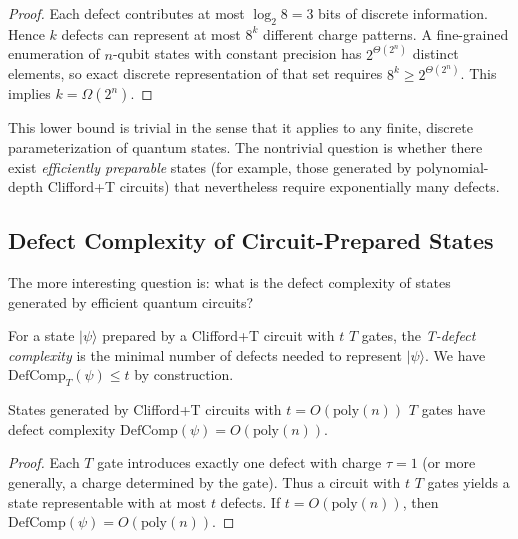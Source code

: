 \begin{proof}
Each defect contributes at most $\log_2 8 = 3$ bits of discrete information. Hence $k$ defects can represent at most $8^k$ different charge patterns. A fine-grained enumeration of $n$-qubit states with constant precision has $2^{\Theta(2^n)}$ distinct elements, so exact discrete representation of that set requires $8^k \ge 2^{\Theta(2^n)}$. This implies $k = \Omega(2^n)$.
\end{proof}

\begin{remark}
This lower bound is trivial in the sense that it applies to any finite, discrete parameterization of quantum states. The nontrivial question is whether there exist \textit{efficiently preparable} states (for example, those generated by polynomial-depth Clifford+T circuits) that nevertheless require exponentially many defects.
\end{remark}

\subsection{Defect Complexity of Circuit-Prepared States}

The more interesting question is: what is the defect complexity of states generated by efficient quantum circuits?

\begin{definition}
For a state $|\psi\rangle$ prepared by a Clifford+T circuit with $t$ $T$ gates, the \textit{T-defect complexity} is the minimal number of defects needed to represent $|\psi\rangle$. We have $\text{DefComp}_T(\psi) \leq t$ by construction.
\end{definition}

\begin{theorem}
\label{thm:t-defect-polynomial}
States generated by Clifford+T circuits with $t = O(\text{poly}(n))$ $T$ gates have defect complexity $\text{DefComp}(\psi) = O(\text{poly}(n))$.
\end{theorem}

\begin{proof}
Each $T$ gate introduces exactly one defect with charge $\tau = 1$ (or more generally, a charge determined by the gate). Thus a circuit with $t$ $T$ gates yields a state representable with at most $t$ defects. If $t = O(\text{poly}(n))$, then $\text{DefComp}(\psi) = O(\text{poly}(n))$.
\end{proof}

